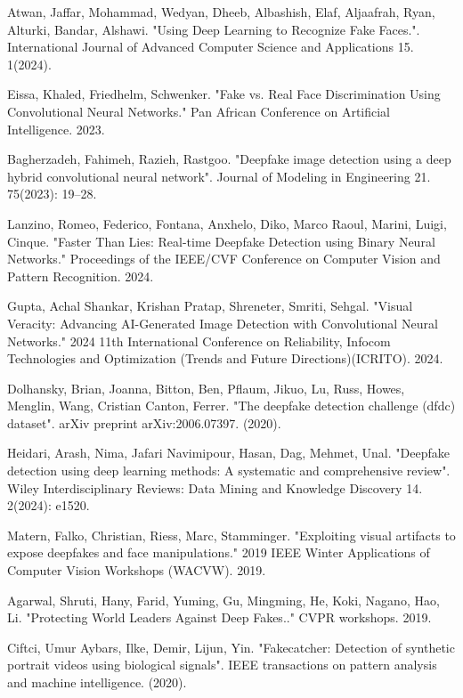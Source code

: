 \documentclass{svproc}
\begin{document}
\begin{thebibliography}{6}
Atwan, Jaffar, Mohammad, Wedyan, Dheeb, Albashish, Elaf, Aljaafrah, Ryan, Alturki, Bandar, Alshawi. "Using Deep Learning to Recognize Fake Faces.". International Journal of Advanced Computer Science and Applications 15. 1(2024).

Eissa, Khaled, Friedhelm, Schwenker. "Fake vs. Real Face Discrimination Using Convolutional Neural Networks." Pan African Conference on Artificial Intelligence. 2023.

Bagherzadeh, Fahimeh, Razieh, Rastgoo. "Deepfake image detection using a deep hybrid convolutional neural network". Journal of Modeling in Engineering 21. 75(2023): 19–28.

Lanzino, Romeo, Federico, Fontana, Anxhelo, Diko, Marco Raoul, Marini, Luigi, Cinque. "Faster Than Lies: Real-time Deepfake Detection using Binary Neural Networks." Proceedings of the IEEE/CVF Conference on Computer Vision and Pattern Recognition. 2024.

Gupta, Achal Shankar, Krishan Pratap, Shreneter, Smriti, Sehgal. "Visual Veracity: Advancing AI-Generated Image Detection with Convolutional Neural Networks." 2024 11th International Conference on Reliability, Infocom Technologies and Optimization (Trends and Future Directions)(ICRITO). 2024.

Dolhansky, Brian, Joanna, Bitton, Ben, Pflaum, Jikuo, Lu, Russ, Howes, Menglin, Wang, Cristian Canton, Ferrer. "The deepfake detection challenge (dfdc) dataset". arXiv preprint arXiv:2006.07397. (2020).

Heidari, Arash, Nima, Jafari Navimipour, Hasan, Dag, Mehmet, Unal. "Deepfake detection using deep learning methods: A systematic and comprehensive review". Wiley Interdisciplinary Reviews: Data Mining and Knowledge Discovery 14. 2(2024): e1520.

Matern, Falko, Christian, Riess, Marc, Stamminger. "Exploiting visual artifacts to expose deepfakes and face manipulations." 2019 IEEE Winter Applications of Computer Vision Workshops (WACVW). 2019.

Agarwal, Shruti, Hany, Farid, Yuming, Gu, Mingming, He, Koki, Nagano, Hao, Li. "Protecting World Leaders Against Deep Fakes.." CVPR workshops. 2019.

Ciftci, Umur Aybars, Ilke, Demir, Lijun, Yin. "Fakecatcher: Detection of synthetic portrait videos using biological signals". IEEE transactions on pattern analysis and machine intelligence. (2020).


\end{thebibliography}
\end{document}
